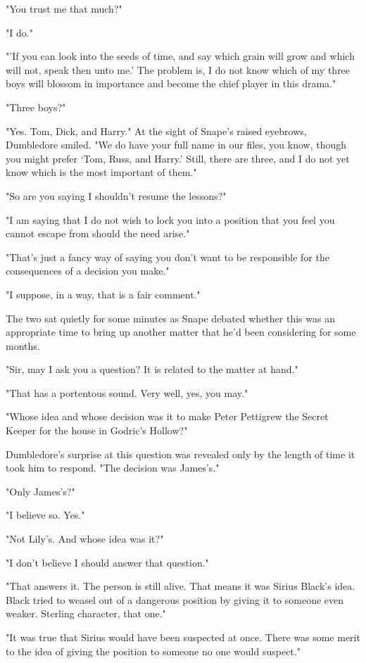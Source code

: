 "You trust me that much?"

"I do."

"'If you can look into the seeds of time, and say which grain will grow and which will not, speak then unto me.' The problem is, I do not know which of my three boys will blossom in importance and become the chief player in this drama."

"Three boys?"

"Yes. Tom, Dick, and Harry." At the sight of Snape's raised eyebrows, Dumbledore smiled. "We do have your full name in our files, you know, though you might prefer `Tom, Russ, and Harry.' Still, there are three, and I do not yet know which is the most important of them."

"So are you saying I shouldn't resume the lessons?"

"I am saying that I do not wish to lock you into a position that you feel you cannot escape from should the need arise."

"That's just a fancy way of saying you don't want to be responsible for the consequences of a decision you make."

"I suppose, in a way, that is a fair comment."

The two sat quietly for some minutes as Snape debated whether this was an appropriate time to bring up another matter that he'd been considering for some months.

"Sir, may I ask you a question? It is related to the matter at hand."

"That has a portentous sound. Very well, yes, you may."

"Whose idea and whose decision was it to make Peter Pettigrew the Secret Keeper for the house in Godric's Hollow?"

Dumbledore's surprise at this question was revealed only by the length of time it took him to respond. "The decision was James's."

"Only James's?"

"I believe so. Yes."

"Not Lily's. And whose idea was it?"

"I don't believe I should answer that question."

"That answers it. The person is still alive. That means it was Sirius Black's idea. Black tried to weasel out of a dangerous position by giving it to someone even weaker. Sterling character, that one."

"It was true that Sirius would have been suspected at once. There was some merit to the idea of giving the position to someone no one would suspect."

